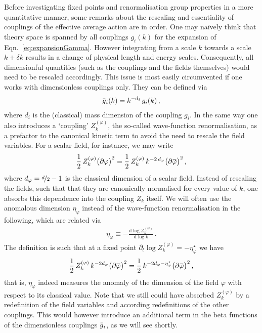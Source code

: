 \documentclass[11pt]{book}
\newcommand{\overbar}[1]{\mkern 1.5mu\overline{\mkern-1.5mu#1\mkern-1.5mu}\mkern 1.5mu}
\newcommand{\bp}{\overbar \varphi}
\numberwithin{equation}{chapter}
\begin{document}
Before investigating fixed points and renormalisation group
properties in a more quantitative manner, some remarks
about the rescaling and essentiality of couplings
of the effective average action are in order.
One may naïvely think that theory space is spanned by
all couplings $g_i(k)$ for the expansion of
Eqn.~\eqref{eq:expansionGamma}. However integrating
from a scale $k$ towards a scale $k + \delta k$
results in a change of physical length and energy scales.
Consequently, all dimensionful quantities (such as the couplings
and the fields themselves) would need to be rescaled accordingly.
This issue is most easily circumvented
if one works with
dimensionless couplings only. They can be defined via
\begin{align}
  \overbar g_i(k) = k^{-d_i} \, g_i(k) \,,
\end{align}
where $d_i$ is the (classical) mass dimension of
the coupling $g_i$. In the same way one also introduces
a `coupling' $Z^{(\varphi)}_k$, the so-called wave-function
renormalisation, as a prefactor to the canonical kinetic term
to avoid the need to rescale the field variables.
For a scalar field, for instance, we may write
\begin{align}
  \frac 12 \, Z^{(\varphi)}_k \big( \partial \varphi \big)^2
  = \frac 12 \, Z^{(\varphi)}_k \, k^{-2 \, d_\varphi} \big( \partial \bp \big)^2 \,,
\end{align}
where $d_\varphi = \nicefrac d2 -1$ is the classical dimension
of a scalar field. Instead of rescaling the fields, such that
that they are canonically normalised for every value of $k$,
one absorbs this dependence into the coupling $Z_k$
itself. We will often use the anomalous dimension $\eta_\varphi$
instead of the wave-function renormalisation in the following,
which are related via
\begin{align}
  \eta_\varphi \equiv - \frac{\mathrm d \log Z^{(\varphi)}_k}{\mathrm d \log k} \,.
\end{align}
The definition is such that at a fixed point
$\partial_t \log Z^{(\varphi)}_k = - \eta_\varphi^\star$
we have
\begin{align}
  \frac 12 \, Z^{(\varphi)}_k \, k^{-2d_\varphi} \big( \partial \bp \big)^2
  = \frac 12 \, k^{-2d_\varphi - \eta^\star_\varphi} \big( \partial \bp \big)^2 \,,
\end{align}
that is, $\eta_\varphi$ indeed measures the anomaly of the dimension
of the field $\varphi$ with respect to its classical value. Note
that we still could have absorbed $Z^{(\varphi)}_k$ by a redefinition
of the field variables and according redefinitions of the other couplings.
This would however introduce an additional term in the beta functions
of the dimensionless couplings $\overbar g_i$, as we will see shortly.
\end{document}
